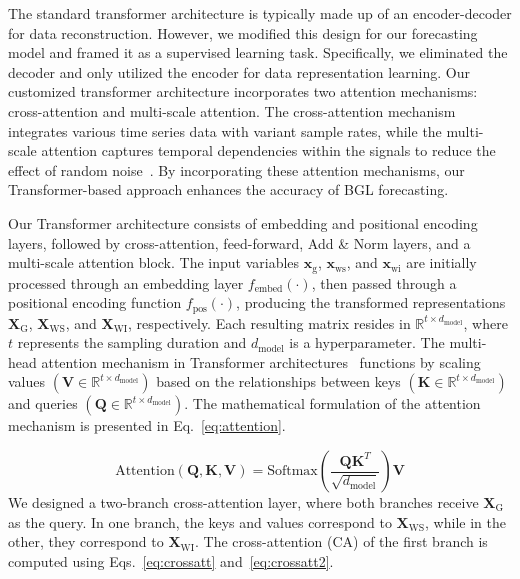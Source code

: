 The standard transformer architecture is typically made up of an encoder-decoder for data reconstruction. However, we modified this design for our forecasting model and framed it as a supervised learning task. Specifically, we eliminated the decoder and only utilized the encoder for data representation learning. Our customized transformer architecture incorporates two attention mechanisms: cross-attention and multi-scale attention. The cross-attention mechanism integrates various time series data with variant sample rates, while the multi-scale attention captures temporal dependencies within the signals to reduce the effect of random noise~\cite{shabani2022scaleformer}. By incorporating these attention mechanisms, our Transformer-based approach enhances the accuracy of BGL forecasting.

Our Transformer architecture consists of embedding and positional encoding layers, followed by cross-attention, feed-forward, Add \& Norm layers, and a multi-scale attention block. The input variables \( \mathbf{x}_\text{g} \), \( \mathbf{x}_\text{ws} \), and \( \mathbf{x}_\text{wi} \) are initially processed through an embedding layer \( f_{\text{embed}}(\cdot) \), then passed through a positional encoding function \( f_{\text{pos}}(\cdot) \), producing the transformed representations \( \mathbf{X}_\text{G} \), \( \mathbf{X}_\text{WS} \), and \( \mathbf{X}_\text{WI} \), respectively. Each resulting matrix resides in \( \mathbb{R}^{t \times d_{\text{model}}} \), where \( t \) represents the sampling duration and \( d_{\text{model}} \) is a hyperparameter. The multi-head attention mechanism in Transformer architectures~\cite{vaswani2017attention} functions by scaling values \( (\mathbf{V} \in \mathbb{R}^{t \times d_\text{model}}) \) based on the relationships between keys \( (\mathbf{K} \in \mathbb{R}^{t \times d_{\text{model}}}) \) and queries \( (\mathbf{Q} \in \mathbb{R}^{t \times d_{\text{model}}}) \). The mathematical formulation of the attention mechanism is presented in Eq.~\ref{eq:attention}.

\begin{equation}
\text{Attention}(\mathbf{Q},\mathbf{K},\mathbf{V})= \text{Softmax} \left(\frac{\mathbf{Q} \mathbf{K}^T}{\sqrt{d_{\text{model}}}} \right)\mathbf{V}
\label{eq:attention}
\end{equation}
We designed a two-branch cross-attention layer, where both branches receive \( \mathbf{X}_\text{G} \) as the query. In one branch, the keys and values correspond to \( \mathbf{X}_{\text{WS}} \), while in the other, they correspond to \( \mathbf{X}_{\text{WI}} \). The cross-attention (CA) of the first branch is computed using Eqs.~\ref{eq:crossatt} and~\ref{eq:crossatt2}.


